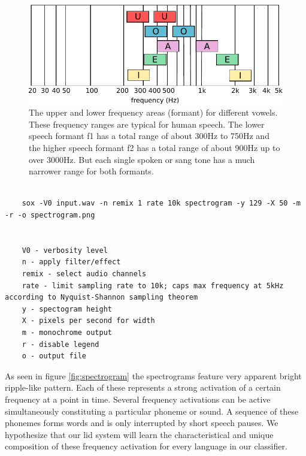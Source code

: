	\begin{figure}[]
  		\centering
    	\includegraphics[width=\textwidth,keepaspectratio]{img/frequencies.pdf}
    	\caption{The upper and lower frequency areas (formant) for different vowels. These frequency ranges are typical for human speech. The lower speech formant f1 has a total range of about 300Hz to 750Hz and the higher speech formant f2 has a total range of about 900Hz up to over 3000Hz. But each single spoken or sang tone has a much narrower range for both formants.}
    	\label{img:frequencies}
	\end{figure}	
	
	\begin{minipage}{\linewidth}
	\begin{lstlisting}[caption={Generating monochrome spectrograms with SoX}, label={lst:spectrograms}]
    
    sox -V0 input.wav -n remix 1 rate 10k spectrogram -y 129 -X 50 -m -r -o spectrogram.png
    
    
    V0 - verbosity level 
    n - apply filter/effect
    remix - select audio channels
    rate - limit sampling rate to 10k; caps max frequency at 5kHz according to Nyquist-Shannon sampling theorem
    y - spectogram height
    X - pixels per second for width
    m - monochrome output
    r - disable legend
    o - output file
    \end{lstlisting}
    \end{minipage}
	
	As seen in figure \ref{fig:spectrogram} the spectrograms feature very apparent bright ripple-like pattern. Each of these represents a strong activation of a certain frequency at a point in time. Several frequency activations can be active simultaneously constituting a particular phoneme or sound. A sequence of these phonemes forms words and is only interrupted by short speech pauses. We hypothesize that our \ac{lid} system will learn the characteristical and unique composition of these frequency activation for every language in our classifier. 

